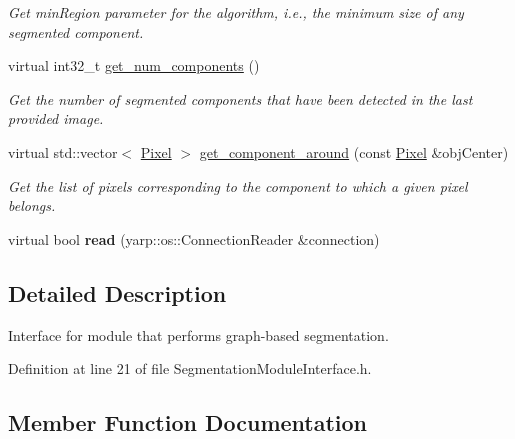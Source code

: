 \begin{DoxyCompactItemize}
\begin{DoxyCompactList}\small\item\em Get min\+Region parameter for the algorithm, i.\+e., the minimum size of any segmented component. \end{DoxyCompactList}\item 
virtual int32\+\_\+t \hyperlink{classyarp_1_1sig_1_1SegmentationModuleInterface_a3c6b695fbef9e6827e7dd6b4cbbc38fe}{get\+\_\+num\+\_\+components} ()
\begin{DoxyCompactList}\small\item\em Get the number of segmented components that have been detected in the last provided image. \end{DoxyCompactList}\item 
virtual std\+::vector$<$ \hyperlink{classyarp_1_1sig_1_1Pixel}{Pixel} $>$ \hyperlink{classyarp_1_1sig_1_1SegmentationModuleInterface_a9bf0b95fbab216b2284122b0b8a36820}{get\+\_\+component\+\_\+around} (const \hyperlink{classyarp_1_1sig_1_1Pixel}{Pixel} \&obj\+Center)
\begin{DoxyCompactList}\small\item\em Get the list of pixels corresponding to the component to which a given pixel belongs. \end{DoxyCompactList}\item 
virtual bool {\bfseries read} (yarp\+::os\+::\+Connection\+Reader \&connection)\label{classyarp_1_1sig_1_1SegmentationModuleInterface_ae35adf3fde4e4dd6e2dea92b6e396794}

\end{DoxyCompactItemize}


\subsection{Detailed Description}
Interface for module that performs graph-\/based segmentation. 

Definition at line 21 of file Segmentation\+Module\+Interface.\+h.



\subsection{Member Function Documentation}
